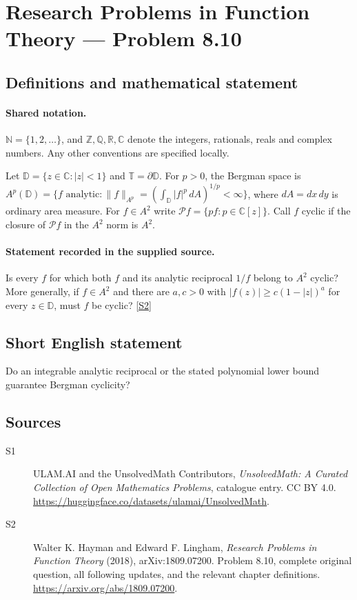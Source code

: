 \documentclass[11pt]{book}
\newcommand{\sref}[2]{\hyperlink{source:#1:#2}{[S#2]}}
\begin{document}
\section{Research Problems in Function Theory — Problem 8.10}\label{statement}

\subsection{Definitions and mathematical statement}

\paragraph{Shared notation.}$\mathbb N=\{1,2,\ldots\}$, and $\mathbb Z,\mathbb Q,\mathbb R,\mathbb C$ denote the integers, rationals, reals and complex numbers. Any other conventions are specified locally.


Let $\mathbb D=\{z\in\mathbb C:|z|<1\}$ and $\mathbb T=\partial\mathbb D$. For $p>0$, the Bergman space is $A^p(\mathbb D)=\{f\text{ analytic}:\|f\|_{A^p}=(\int_{\mathbb D}|f|^p\,dA)^{1/p}<\infty\}$, where $dA=dx\,dy$ is ordinary area measure. For $f\in A^2$ write $\mathcal Pf=\{pf:p\in\mathbb C[z]\}$. Call $f$ cyclic if the closure of $\mathcal Pf$ in the $A^2$ norm is $A^2$.
\paragraph{Statement recorded in the supplied source.}
Is every $f$ for which both $f$ and its analytic reciprocal $1/f$ belong to $A^2$ cyclic? More generally, if $f\in A^2$ and there are $a,c>0$ with $|f(z)|\ge c(1-|z|)^a$ for every $z\in\mathbb D$, must $f$ be cyclic? \sref{statement}{2}
\subsection{Short English statement}
Do an integrable analytic reciprocal or the stated polynomial lower bound guarantee Bergman cyclicity?
\subsection{Sources}
\begin{description}
\item[\hypertarget{source:statement:1}{S1}] ULAM.AI and the UnsolvedMath Contributors, \emph{UnsolvedMath: A Curated Collection of Open Mathematics Problems}, catalogue entry. CC BY 4.0. \url{https://huggingface.co/datasets/ulamai/UnsolvedMath}.
\item[\hypertarget{source:statement:2}{S2}] Walter K. Hayman and Edward F. Lingham, \emph{Research Problems in Function Theory} (2018), arXiv:1809.07200. Problem 8.10, complete original question, all following updates, and the relevant chapter definitions. \url{https://arxiv.org/abs/1809.07200}.
\end{description}
\label{end:statement}
\end{document}
